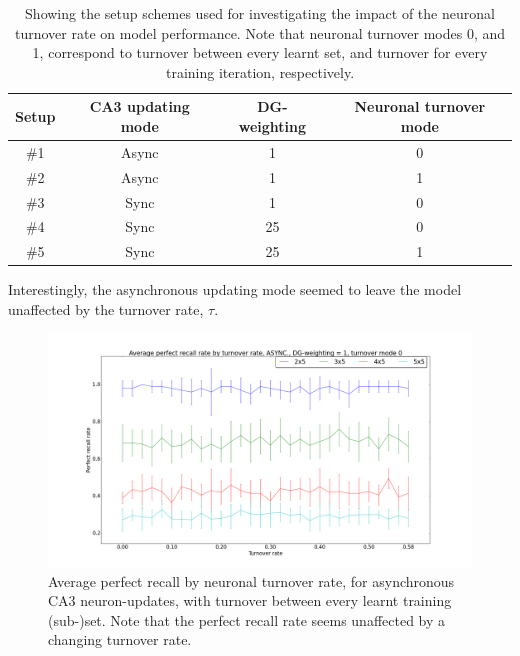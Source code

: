 \begin{table}[]
\centering
\caption{Showing the setup schemes used for investigating the impact of the neuronal turnover rate on model performance. Note that neuronal turnover modes 0, and 1, correspond to turnover between every learnt set, and turnover for every training iteration, respectively.}
\label{table:turnover_schemes}
\begin{tabular}{|c|c|c|c|}
\hline
Setup & CA3 updating mode & DG-weighting & Neuronal turnover mode       \\ \hline
\#1   & Async               & 1                  & 0                     \\ \hline
\#2   & Async               & 1                  & 1                     \\ \hline
\#3   & Sync                & 1                  & 0                     \\ \hline
\#4   & Sync                & 25                 & 0                     \\ \hline
\#5   & Sync                & 25                 & 1                     \\ \hline
\end{tabular}
\end{table}

Interestingly, the asynchronous updating mode seemed to leave the model unaffected by the turnover rate, $\tau$.

\begin{figure}
    \centering
    \includegraphics[width=14cm]{fig/average_perfect_recall_rates_by_set_size_async_dgw_1_t_m_0}
    \caption{Average perfect recall by neuronal turnover rate, for asynchronous CA3 neuron-updates, with turnover between every learnt training (sub-)set. Note that the perfect recall rate seems unaffected by a changing turnover rate.}
    \label{fig:average_perfect_recall_rates_by_set_size_async_dgw_1_t_m_0}
\end{figure}

